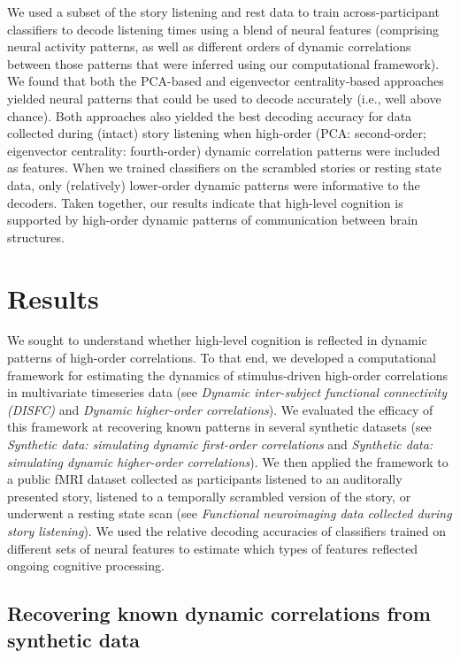 \documentclass[english]{article}
\begin{document}
We used a subset of the story listening and rest data to train
across-participant classifiers to decode listening times using a blend
of neural features (comprising neural activity patterns, as well as
different orders of dynamic correlations between those patterns that
were inferred using our computational framework).  We found that both
the PCA-based and eigenvector centrality-based approaches yielded
neural patterns that could be used to decode accurately (i.e., well
above chance).  Both approaches also yielded the best decoding
accuracy for data collected during (intact) story listening when
high-order (PCA: second-order; eigenvector centrality: fourth-order)
dynamic correlation patterns were included as features.  When we
trained classifiers on the scrambled stories or resting state data,
only (relatively) lower-order dynamic patterns were informative to the decoders.
Taken together, our results indicate that high-level cognition is
supported by high-order dynamic patterns of communication between
brain structures.




\section*{Results}
We sought to understand whether high-level cognition is reflected in
dynamic patterns of high-order correlations.  To that end, we
developed a computational framework for estimating the dynamics of
stimulus-driven high-order correlations in multivariate timeseries
data (see \textit{Dynamic inter-subject functional connectivity
  (DISFC)} and \textit{Dynamic higher-order correlations}).  We
evaluated the efficacy of this framework at recovering known patterns
in several synthetic datasets (see \textit{Synthetic data: simulating
  dynamic first-order correlations} and \textit{Synthetic data:
  simulating dynamic higher-order correlations}).  We then
applied the framework to a public fMRI dataset collected as
participants listened to an auditorally presented story, listened to a
temporally scrambled version of the story, or underwent a resting
state scan (see \textit{Functional neuroimaging data collected during
  story listening}).  We used the relative decoding accuracies of
classifiers trained on different sets of neural features to estimate
which types of features reflected ongoing cognitive processing.

\subsection*{Recovering known dynamic correlations from synthetic
  data}
\end{document}
